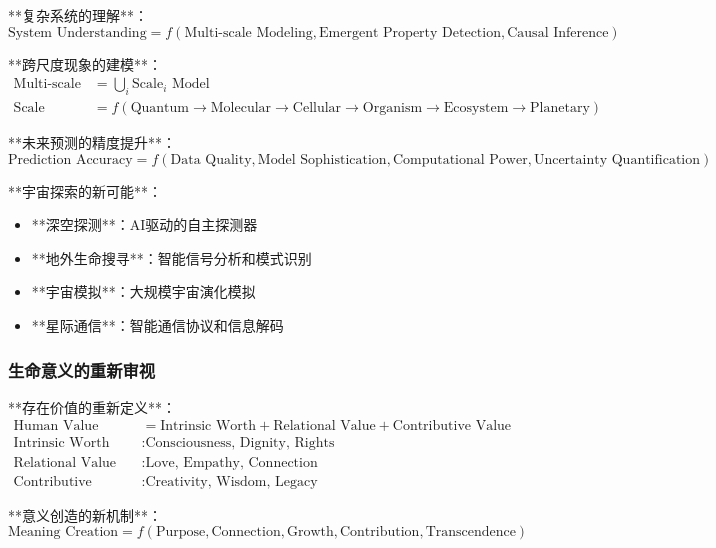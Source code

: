 **复杂系统的理解**：
\begin{equation}
\text{System Understanding} = f(\text{Multi-scale Modeling}, \text{Emergent Property Detection}, \text{Causal Inference})
\end{equation}

**跨尺度现象的建模**：
\begin{align}
\text{Multi-scale Model} &= \bigcup_{i} \text{Scale}_i \text{ Model} \\
\text{Scale Integration} &= f(\text{Quantum} \to \text{Molecular} \to \text{Cellular} \to \text{Organism} \to \text{Ecosystem} \to \text{Planetary})
\end{align}

**未来预测的精度提升**：
\begin{equation}
\text{Prediction Accuracy} = f(\text{Data Quality}, \text{Model Sophistication}, \text{Computational Power}, \text{Uncertainty Quantification})
\end{equation}

**宇宙探索的新可能**：
\begin{itemize}
\item **深空探测**：AI驱动的自主探测器
\item **地外生命搜寻**：智能信号分析和模式识别
\item **宇宙模拟**：大规模宇宙演化模拟
\item **星际通信**：智能通信协议和信息解码
\end{itemize}

\subsubsection{生命意义的重新审视} %

**存在价值的重新定义**：
\begin{align}
\text{Human Value} &= \text{Intrinsic Worth} + \text{Relational Value} + \text{Contributive Value} \\
\text{Intrinsic Worth} &: \text{Consciousness, Dignity, Rights} \\
\text{Relational Value} &: \text{Love, Empathy, Connection} \\
\text{Contributive Value} &: \text{Creativity, Wisdom, Legacy}
\end{align}

**意义创造的新机制**：
\begin{equation}
\text{Meaning Creation} = f(\text{Purpose}, \text{Connection}, \text{Growth}, \text{Contribution}, \text{Transcendence})
\end{equation}


